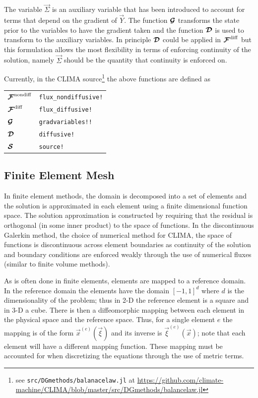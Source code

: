 \documentclass{report}
\begin{document}
{The variable $\vec{\Sigma}$ is an auxiliary variable that has been introduced to
account for terms that depend on the gradient of $\vec{Y}$. The function
$\boldsymbol{{\mathcal{G}}}$ transforms the state prior to the variables to have the
gradient taken and the function $\boldsymbol{{\mathcal{D}}}$ is used to transform to the
auxiliary variables. In principle $\boldsymbol{{\mathcal{D}}}$ could be applied in $\boldsymbol{{\mathcal{F}}}^{\mathrm{diff}}$ but
this formulation allows the most flexibility in terms of enforcing continuity of
the solution, namely $\vec{\Sigma}$ should be the quantity that continuity is
enforced on.

Currently, in the CLIMA source\footnote{see
\texttt{src/DGmethods/balanacelaw.jl} at
\url{https://github.com/climate-machine/CLIMA/blob/master/src/DGmethods/balancelaw.jl}}
the above functions are defined as

\begin{table}[h]
  \centering
  \begin{tabular}{ll}
    $\boldsymbol{{\mathcal{F}}}^{\mathrm{nondiff}}$       & \texttt{flux\_nondiffusive!}\\
    $\boldsymbol{{\mathcal{F}}}^{\mathrm{diff}}$          & \texttt{flux\_diffusive!}\\
    $\boldsymbol{{\mathcal{G}}}$  & \texttt{gradvariables!!}\\
    $\boldsymbol{{\mathcal{D}}}$      & \texttt{diffusive!}\\
    $\boldsymbol{{\mathcal{S}}}$         & \texttt{source!}\\
  \end{tabular}
\end{table}

\subsection{Finite Element Mesh}
In finite element methods, the domain is decomposed into a set of elements and
the solution is approximated in each element using a finite dimensional function
space. The solution approximation is constructed by requiring that the residual
is orthogonal (in some inner product) to the space of functions. In the
discontinuous Galerkin method, the choice of numerical method for CLIMA,
the space of functions is discontinuous across element boundaries as continuity
of the solution and boundary conditions are enforced weakly through the use of
numerical fluxes (similar to finite volume methods).

As is often done in finite elements, elements are mapped to a reference domain.
In the reference domain the elements have the domain ${[-1, 1]}^d$ where $d$ is
the dimensionality of the problem; thus in 2-D the reference element is a square
and in 3-D a cube. There is then a diffeomorphic mapping between each element in
the physical space and the reference space. Thus, for a single element $e$ the
mapping is of the form $\vec{x}^{(e)}(\vec{\xi})$ and its inverse is
$\vec{\xi}^{(e)}(\vec{x})$; note that each element will have a different mapping
function. These mapping must be accounted for when discretizing the equations
through the use of metric terms.

}
\end{document}
